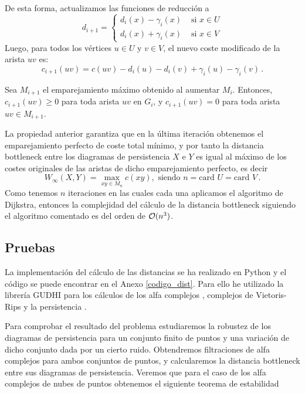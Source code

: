 De esta forma, actualizamos las funciones de reducción a
\[
d_{i+1} = \begin{cases}
d_i(x) - \gamma_i(x) & \text{ si } x \in U \\ 
d_i(x) + \gamma_i(x) & \text{ si } x \in V 
\end{cases}
\]
Luego, para todos los vértices $u \in U$ y $v \in V$, el nuevo coste modificado de la arista $uv$ es:
\[
c_{i+1}(uv)=c(uv) - d_i(u) - d_i(v) + \gamma_i(u) - \gamma_i(v)\,.
\]

\begin{property}
Sea $M_{i+1}$ el emparejamiento máximo obtenido al aumentar $M_i$. Entonces, $c_{i+1}(uv) \geq 0$ para toda arista $uv$ en $G_i$, y  $c_{i+1}(uv) = 0$ para toda arista $uv \in M_{i+1}$.
\end{property}

La propiedad anterior garantiza que en la última iteración obtenemos el emparejamiento perfecto de coste total mínimo, y por tanto la distancia bottleneck entre los diagramas de persistencia $X$ e $Y$ es igual al máximo de los costes originales de las aristas de dicho emparejamiento perfecto, es decir
\[
W_\infty(X,Y)=\max_{xy \in M_n} c(xy),\text{ siendo } n= \text{card } U = \text{card } V\,.
\]
Como tenemos $n$ iteraciones en las cuales cada una aplicamos el algoritmo de Dijkstra, entonces la complejidad del cálculo de la distancia bottleneck siguiendo el algoritmo comentado es del orden de $\mathcal{O}(n^3)$.

\subsection{Pruebas}
La implementación del cálculo de las distancias se ha realizado en Python y el código se puede encontrar en el Anexo \ref{codigo_dist}. Para ello he utilizado la librería GUDHI para los cálculos de los alfa complejos \cite{gudhi:AlphaComplex}, complejos de Vietoris-Rips \cite{gudhi:RipsComplex} y la persistencia \cite{gudhi:PersistenceRepresentations}.

Para comprobar el resultado del problema estudiaremos la robustez de los diagramas de persistencia para un conjunto finito de puntos y una variación de dicho conjunto dada por un cierto ruido. Obtendremos filtraciones de alfa complejos para ambos conjuntos de puntos, y calcularemos la distancia bottleneck entre sus diagramas de persistencia. Veremos que para el caso de los alfa complejos de nubes de puntos obtenemos el siguiente teorema de estabilidad

